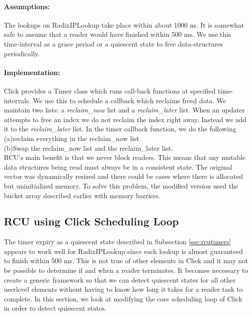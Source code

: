 \documentclass{article}
\begin{document}
\paragraph{Assumptions:}
The lookups on RadixIPLookup take place within about 1000 ns. It is somewhat safe to assume that a reader would have finished within 500 ms.
We use this time-interval as a grace period or a quiescent state to free data-structures periodically.
\paragraph{Implementation:}
Click provides a Timer class which runs call-back functions at specified time-intervals. We use this to schedule a callback which reclaims freed data.
We maintain two lists: a \emph{reclaim\_now} list and a \emph{reclaim\_later} list. When an updater attempts to free an index we do not reclaim the index right away. Instead we add it to the \emph{reclaim\_later} list.
In the timer callback function, we do the following \\(a)reclaim everything in the reclaim\_now list \\ (b)Swap the reclaim\_now list and the reclaim\_later list.
\\ RCU's main benefit is that we never block readers. This means that any mutable data structures being read must always be in a consistent state. The original vector was dynamically resized and there could be cases where there is allocated but uninitialized memory. To solve this problem, the modified version used the bucket array described earlier with memory barriers. 
\subsection{RCU using Click Scheduling Loop}
The timer expiry as a quiescent state described in Subsection \ref{sec:rcutimers} appears to work well for RadixIPLookup since each lookup is almost guaranteed to finish within 500 ms. This is not true of other elements in Click and it may not be possible to determine if and when a reader terminates. It becomes necessary to create a generic framework so that we can detect quiescent states for all other userlevel elements without having to know how long it takes for a reader task to complete. In this section, we look at modifying the core scheduling loop of Click in order to detect quiescent states.
\end{document}
